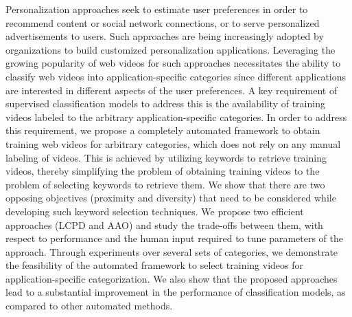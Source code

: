 


Personalization approaches seek to estimate user preferences in order to recommend content or social network connections, or to serve personalized advertisements to users. Such approaches are being increasingly adopted by organizations to build customized personalization applications. Leveraging the growing popularity of web videos for such approaches necessitates the ability to classify web videos into application-specific categories since different applications are interested in different aspects of the user preferences. A key requirement of supervised classification models to address this is the availability of training videos labeled to the arbitrary application-specific categories. In order to address this requirement, we propose a completely automated framework to obtain training web videos for arbitrary categories, which does not rely on any manual labeling of videos. This is achieved by utilizing keywords to retrieve training videos, thereby simplifying the problem of obtaining training videos to the problem of selecting keywords to retrieve them. We show that there are two opposing objectives (proximity and diversity) that need to be considered while developing such keyword selection techniques. We propose two efficient approaches (LCPD and AAO) and study the trade-offs between them, with respect to performance and the human input required to tune parameters of the approach. Through experiments over several sets of categories, we demonstrate the feasibility of the automated framework to select training videos for application-specific categorization. We also show that the proposed approaches lead to a substantial improvement in the performance of classification models, as compared to other automated methods. 













